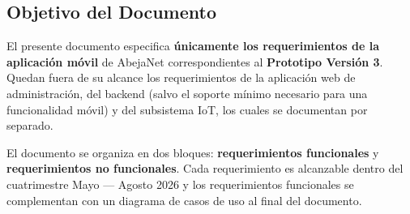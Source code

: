 \subsection{Objetivo del Documento}

El presente documento especifica \textbf{únicamente los requerimientos de la aplicación móvil} de AbejaNet correspondientes al \textbf{Prototipo Versión 3}. Quedan fuera de su alcance los requerimientos de la aplicación web de administración, del backend (salvo el soporte mínimo necesario para una funcionalidad móvil) y del subsistema IoT, los cuales se documentan por separado.

El documento se organiza en dos bloques: \textbf{requerimientos funcionales} y \textbf{requerimientos no funcionales}. Cada requerimiento es alcanzable dentro del cuatrimestre Mayo — Agosto 2026 y los requerimientos funcionales se complementan con un diagrama de casos de uso al final del documento.
